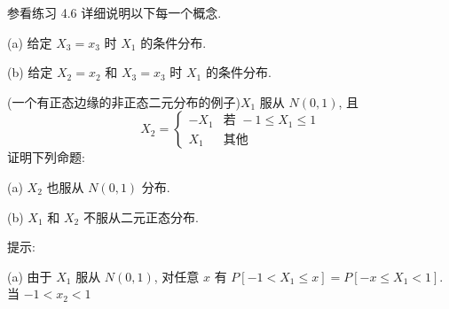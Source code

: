 \quad 参看练习 4.6 详细说明以下每一个概念.

\noindent (a) 给定 $X_3 = x_3$ 时 $X_1$ 的条件分布.

\noindent (b) 给定 $X_2 = x_2$ 和 $X_3 = x_3$ 时 $X_1$ 的条件分布.

\quad (一个有正态边缘的非正态二元分布的例子)$X_1$ 服从 $N(0, 1)$, 且
\[
X_2 = \begin{cases} -X_1 & \text{若 } -1 \leq X_1 \leq 1 \\ X_1 & \text{其他} \end{cases}
\]
证明下列命题:

\noindent (a) $X_2$ 也服从 $N(0, 1)$ 分布.

\noindent (b) $X_1$ 和 $X_2$ 不服从二元正态分布.

\noindent 提示:

\noindent (a) 由于 $X_1$ 服从 $N(0, 1)$, 对任意 $x$ 有 $P[-1 < X_1 \leq x] = P[-x \leq X_1 < 1]$. 当 $-1 < x_2 < 1$
